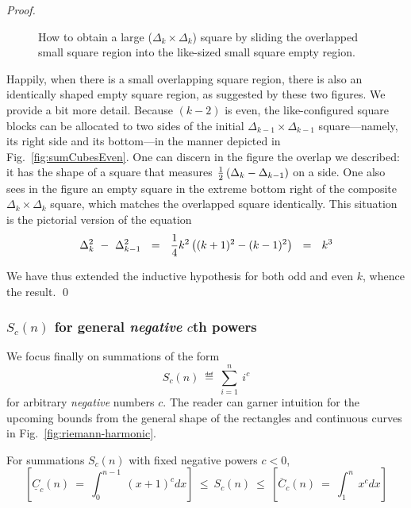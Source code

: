 \begin{proof}
\begin{figure}[hbt]
\begin{center}
\caption{How to obtain a large ($\Delta_k \times \Delta_k$) square by sliding the overlapped small square region into the like-sized small square empty region.}
       \label{fig:sumCubesEvenFinal}
\end{center}
\end{figure}
Happily, when there is a small overlapping square region, there is also an identically shaped empty square region, as suggested by these two figures.  We provide a bit more detail.  Because $(k-2)$ is even, the like-configured square blocks can be allocated to two sides of the initial $\Delta_{k-1} \times \Delta_{k-1}$ square---namely, its right side and its bottom---in the manner depicted in Fig.~\ref{fig:sumCubesEven}.  One can discern in the figure the overlap we described: it has the shape of a square that measures  ${1 \over 2} \left( \Delta_k - \Delta_{k-1}\right)$ on a side.  One also sees in the figure an empty square in the extreme bottom right of the composite $\Delta_k \times \Delta_k$ square, which matches the overlapped square identically.  This situation is the pictorial version of the equation
\[ \Delta_k^2 \ - \ \Delta_{k-1}^2 
 \ \ =  \ \ {1 \over 4} k^2 \left( (k+1)^2 - (k-1)^2 \right)  \ \ = \ \ k^3 \]

We have thus extended the inductive hypothesis for both odd and even $k$, whence the
result.  \qed
\end{proof}


\subsubsection{$S_c(n)$ for general {\em negative} $c$th powers}
\label{sec:sum-of-i2c<0}

We focus finally on summations of the form
\[ S_c(n) \ \eqdef \ \sum_{i=1}^n \ i^c \]
for arbitrary {\em negative} numbers $c$. 
The reader can garner intuition for the upcoming bounds from the general shape of the rectangles and continuous curves in 
Fig.~\ref{fig:riemann-harmonic}.

\begin{prop}
\label{thm:general-bounds-negative-xc}
For summations $S_c(n)$ with fixed negative powers $c<0$,
\begin{equation} 
\label{eq:general-bounds-negative-xc}
\left[
\underline{C}_c(n) \ = \ \int_0^{n-1} \ (x+1)^c dx
\right]
\ \leq \ S_c(n) \ \leq \
\left[
\overline{C}_c(n) \ = \ \int_1^n \ x^c dx
\right]
\end{equation}
\end{prop}

